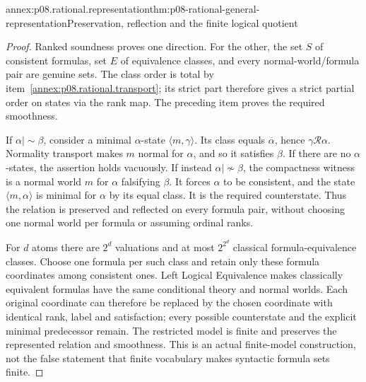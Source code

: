 \begin{annexitem}{annex:p08.rational.representation}{thm:p08-rational-general-representation}{Preservation, reflection and the finite logical quotient}
\begin{proof}
Ranked soundness proves one direction. For the other, the set \(S\)
of consistent formulas, set \(E\) of equivalence classes, and every
normal-world/formula pair are genuine sets. The class order is total
by item~\ref{annex:p08.rational.transport}; its strict part therefore
gives a strict partial order on states via the rank map. The preceding
item proves the required smoothness.

If \(\alpha\mathrel{|\!\sim}\beta\), consider a minimal
\(\alpha\)-state \(\langle m,\gamma\rangle\). Its class
equals \(\overline\alpha\), hence
\(\gamma\mathcal R\alpha\). Normality transport makes \(m\)
normal for \(\alpha\), and so it satisfies \(\beta\).
If there are no \(\alpha\)-states, the assertion holds vacuously.
If instead \(\alpha\mathrel{|\!\not\sim}\beta\), the
compactness witness is a normal world \(m\) for \(\alpha\)
falsifying \(\beta\). It forces \(\alpha\) to be consistent,
and the state \(\langle m,\alpha\rangle\) is minimal for
\(\alpha\) by its equal class. It is the required counterstate.
Thus the relation is preserved and reflected on every formula pair,
without choosing one normal world per formula or assuming ordinal ranks.

For \(d\) atoms there are \(2^d\) valuations and at most
\(2^{2^d}\) classical formula-equivalence classes. Choose one formula
per such class and retain only these formula coordinates among consistent
ones. Left Logical Equivalence makes classically equivalent formulas have
the same conditional theory and normal worlds. Each original coordinate
can therefore be replaced by the chosen coordinate with identical rank,
label and satisfaction; every possible counterstate and the explicit
minimal predecessor remain. The restricted model is finite and preserves
the represented relation and smoothness. This is an actual finite-model
construction, not the false statement that finite vocabulary makes
syntactic formula sets finite.
\end{proof}
\end{annexitem}

